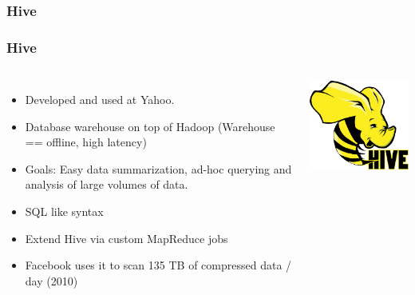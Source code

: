 \subsubsection{Hive}

\begin{frame}
 \frametitle{Hive}
\begin{columns}
 \begin{itemize}
  \item Developed and used at Yahoo.
  \item Database warehouse on top of Hadoop (Warehouse == offline, high latency)
  \item Goals: Easy data summarization, ad-hoc querying and analysis of large volumes of data. 
  \item SQL like syntax
  \item Extend Hive via custom MapReduce jobs
  \item Facebook uses it to scan 135 TB of compressed data / day (2010)
\end{itemize}
 \includegraphics[width=\textwidth,keepaspectratio=true]{figs/12/hive_logo}
\end{columns}
\end{frame}

